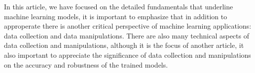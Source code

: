 
\par
In this article, we have focused on the detailed fundamentals that underline machine learning models, it is important to emphasize that in addition to approperate there is another critical perspective of machine learning applications: data collection and data manipulations. There are also many technical aspects of data collection and manipulations, although it is the focus of another article, it also important to appreciate the significance of data collection and manipulations on the accuracy and robustness of the trained models.
\par 
